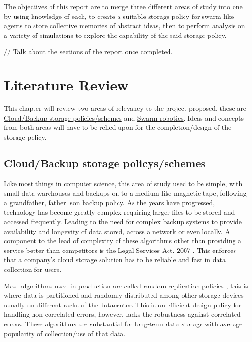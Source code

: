 \documentclass{UoYCSproject}
\begin{document}
The objectives of this report are to merge three different areas of study into one by using knowledge of each, to create a suitable storage policy for swarm like agents to store collective memories of abstract ideas, then to perform analysis on a variety of simulations to explore the capability of the said storage policy.

// Talk about the sections of the report once completed.

\chapter{Literature Review}
\label{cha:Literature Review}

This chapter will review two areas of relevancy to the project proposed, these are \hyperref[sec:Cloud]{Cloud/Backup storage policies/schemes} and \hyperref[sec:Robotics]{Swarm robotics}. Ideas and concepts from both areas will have to be relied upon for the completion/design of the storage policy.

\section{Cloud/Backup storage policys/schemes}
\label{sec:Cloud}

Like most things in computer science, this area of study used to be simple, with small data-warehouses and backups on to a medium like magnetic tape, following a grandfather, father, son backup policy.
As the years have progressed, technology has become greatly complex requiring larger files to be stored and accessed frequently. 
Leading to the need for complex backup systems to provide availability and longevity of data stored, across a network or even locally.
A component to the lead of complexity of these algorithms other than providing a service better than competitors is the Legal Services Act. 2007 \cite{LSA}. This enforces that a company's cloud storage solution has to be reliable and fast in data collection for users.

Most algorithms used in production are called random replication policies \cite{Avalability storage}, this is where data is partitioned and randomly distributed among other storage devices usually on different racks of the datacenter.
This is an efficient design policy for handling non-correlated errors, however, lacks the robustness against correlated errors.
These algorithms are substantial for long-term data storage with average popularity of collection/use of that data.
\end{document}
